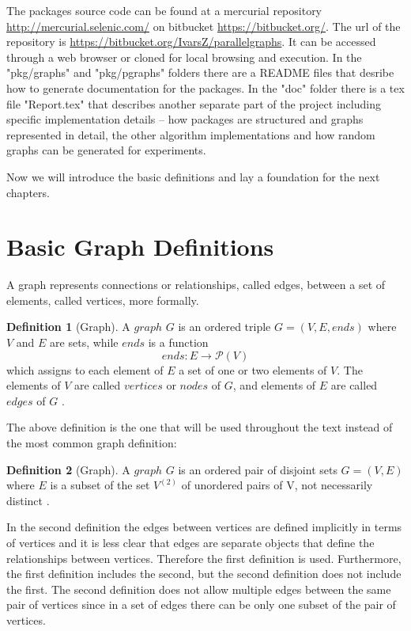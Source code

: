 \documentclass{report}
\theoremstyle{plain}
\theoremstyle{definition}
\newtheorem{definition}{Definition}
\theoremstyle{remark}
\numberwithin{definition}{chapter}
\numberwithin{example}{chapter}
\numberwithin{figure}{chapter}
\numberwithin{theorem}{chapter}
\numberwithin{lemma}{chapter}
\begin{document}
The packages source code can be found at a mercurial repository
\url{http://mercurial.selenic.com/} on bitbucket \url{https://bitbucket.org/}. The url of the repository is \url{https://bitbucket.org/IvarsZ/parallelgraphs}. It can be accessed through a web browser or cloned for local browsing and execution. In the "pkg/graphs" and "pkg/pgraphs" folders there are a README files that desribe how to generate documentation for the packages. In the "doc" folder there is a tex file "Report.tex" that describes another separate part of the project including specific implementation details -- how packages are structured and graphs represented in detail, the other algorithm implementations and how random graphs can be generated for experiments.

Now we will introduce the basic definitions and lay a foundation for the next chapters.

\section{Basic Graph Definitions}

A graph represents connections or relationships, called edges, between a set of elements, called vertices, more formally.

\begin{definition}[Graph]
A $graph$  $G$ is an ordered triple $G = (V, E, ends)$ where $V$ and $E$ are sets, while $ends$ is a function 
  \begin{equation}
  ends:E\to \mathcal P \left({V}\right)
  \end{equation}
which assigns to each element of $E$ a set of one or two elements of $V$. The elements of $V$ are called $vertices$ or $nodes$ of $G$, and elements of $E$ are called $edges$ of $G$ \cite{bondy2008graph}.
\end{definition}

The above definition is the one that will be used throughout the text instead of the most common graph definition:

\begin{definition}[Graph]
A $graph$  $G$ is an ordered pair of disjoint sets $G = (V, E)$ where $E$ is a subset of the set $V^{(2)}$ of unordered pairs of V, not necessarily distinct \cite{bollobas1998modern}. 
\end{definition} 

In the second definition the edges between vertices are defined implicitly in terms of vertices and it is less clear that edges are separate objects that define the relationships between vertices. Therefore the first definition is used. Furthermore, the first definition includes the second, but the second definition does not include the first. The second definition does not allow multiple edges between the same pair of vertices since in a set of edges there can be only one subset of the pair of vertices.
\end{document}
